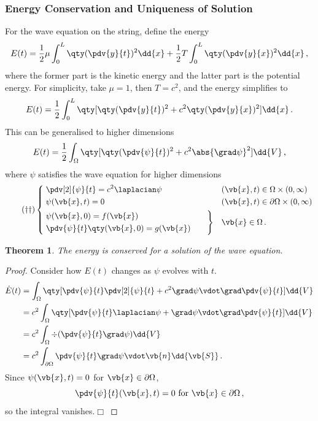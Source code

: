 \documentclass{article}
\theoremstyle{plain}\theoremheaderfont{\normalfont\itshape}\theorembodyfont{\rmfamily}\theoremseparator{.}\newtheorem*{rem}{Remark}\newtheorem*{ex}{Example}\newtheorem*{proof}{Proof}\newtheorem*{altp}{Alternative proof}
\theoremstyle{plain}\theoremheaderfont{\normalfont\bfseries}\theorembodyfont{\rmfamily}\theoremseparator{.}\newtheorem{thm}{Theorem}[section]\newtheorem{lem}[thm]{Lemma}\newtheorem{prop}[thm]{Proposition}\newtheorem*{cor}{Corollary}\newtheorem{defn}[thm]{Definition}\newtheorem{clm}[thm]{Claim}\newtheorem{clminproof}{Claim}
\theoremstyle{break}\theoremheaderfont{\normalfont\itshape}\theorembodyfont{\rmfamily}\theoremseparator{.\medskip}\newtheorem*{proofskip}{Proof}\newtheorem*{exs}{Examples}\newtheorem*{rems}{Remarks}
\theoremstyle{break}\theoremheaderfont{\normalfont\bfseries}\theorembodyfont{\rmfamily}\theoremseparator{.\medskip}\newtheorem{lemskip}[thm]{Lemma}\newtheorem{defnskip}[thm]{Definition}\newtheorem{propskip}[thm]{Proposition}\newtheorem{thmskip}[thm]{Theorem}
\numberwithin{equation}{section}
\newcommand{\qed}{\hfill\ensuremath{\Box}}
\begin{document}
	\subsubsection{Energy Conservation and Uniqueness of Solution}
	For the wave equation on the string, define the energy
	\[E(t)=\frac{1}{2}\mu\int_{0}^{L}\qty(\pdv{y}{t})^2\dd{x}+\frac{1}{2}T\int_{0}^{L}\qty(\pdv{y}{x})^2\dd{x}\,,\]
	where the former part is the kinetic energy and the latter part is the potential energy. For simplicity, take \(\mu=1\), then \(T=c^2\), and the energy simplifies to
	\[E(t)=\frac{1}{2}\int_{0}^{L}\qty[\qty(\pdv{y}{t})^2+c^2\qty(\pdv{y}{x})^2]\dd{x}\,.\]
	This can be generalised to higher dimensions
	\[E(t)=\frac{1}{2}\int_\Omega \qty[\qty(\pdv{\psi}{t})^2+c^2\abs{\grad \psi}^2]\dd{V}\,,\]
	where \(\psi\) satisfies the wave equation for higher dimensions
	\begin{equation}\tag{\(\dagger\dagger\)}
		\left\{\begin{aligned}
			& \;\pdv[2]{\psi}{t}=c^2\laplacian \psi && (\vb{x},t)\in\Omega\times(0,\infty)\\
			& \;\psi(\vb{x},t)=0 && (\vb{x},t)\in\partial\Omega\times(0,\infty)\\
			& \left.\begin{aligned}
				& \psi(\vb{x},0)=f(\vb{x})\\
				& \pdv{\psi}{t}\qty(\vb{x},0)=g(\vb{x})
			\end{aligned}\qquad\right\} && \vb{x}\in\Omega\,.
		\end{aligned}\right.
	\end{equation}

	\begin{thm}
		The energy is conserved for a solution of the wave equation.
	\end{thm}
	\begin{proof}
		Consider how \(E(t)\) changes as \(\psi\) evolves with \(t\).
		\begin{align*}
			\dot{E}(t)&=\int_\Omega\qty[\pdv{\psi}{t}\pdv[2]{\psi}{t}+c^2\grad \psi\vdot\grad\pdv{\psi}{t}]\dd{V}\\
			&=c^2\int_\Omega\qty[\pdv{\psi}{t}\laplacian \psi+\grad \psi\vdot\grad\pdv{\psi}{t}]\dd{V}\\
			&=c^2\int_\Omega\div(\pdv{\psi}{t}\grad \psi)\dd{V}\\
			&=c^2\int_{\partial\Omega}\pdv{\psi}{t}\grad \psi\vdot\vb{n}\dd{\vb{S}}\,.
		\end{align*}
		Since \(\psi(\vb{x},t)=0\) for \(\vb{x}\in\partial\Omega\),
		\[\pdv{\psi}{t}(\vb{x},t)=0\text{ for }\vb{x}\in\partial\Omega\,,\]
		so the integral vanishes.\qed
	\end{proof}
\end{document}
